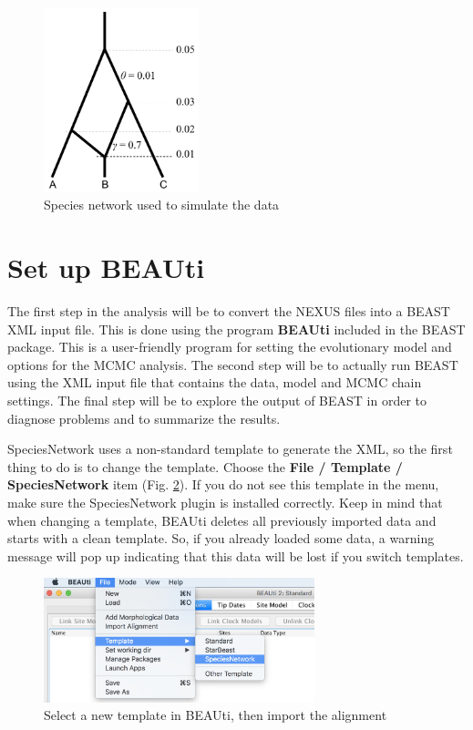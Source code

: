 \documentclass[11pt]{article}
\begin{document}
\begin{figure}[h]
\center
\includegraphics[width=0.4\textwidth]{figs/fig1_spnetwork}
\caption{Species network used to simulate the data}
\label{fig_spnetwork}
\end{figure}

\section*{Set up BEAUti}

The first step in the analysis will be to convert the NEXUS files into a BEAST XML input file. This is done using the program {\bf BEAUti} included in the BEAST package. This is a user-friendly program for setting the evolutionary model and options for the MCMC analysis. The second step will be to actually run BEAST using the XML input file that contains the data, model and MCMC chain settings. The final step will be to explore the output of BEAST in order to diagnose problems and to summarize the results.

SpeciesNetwork uses a non-standard template to generate the XML, so the first thing to do is to change the template. Choose the {\bf File / Template / SpeciesNetwork} item (Fig. \ref{fig_template}). If you do not see this template in the menu, make sure the SpeciesNetwork plugin is installed correctly.
Keep in mind that when changing a template, BEAUti deletes all previously imported data and starts with a clean template. So, if you already loaded some data, a warning message will pop up indicating that this data will be lost if you switch templates.

\begin{figure}[h]
\center
\includegraphics[width=0.7\textwidth]{figs/fig2_template}
\caption{Select a new template in BEAUti, then import the alignment}
\label{fig_template}
\end{figure}
\end{document}
